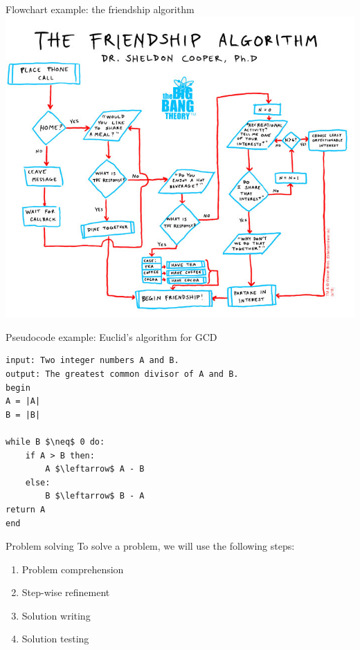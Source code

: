 \documentclass[aspectratio=169,]{beamer}
\begin{document}
\begin{frame}{Flowchart example: the friendship algorithm}
    \centering
    \includegraphics[height=\textheight]{block_sheldon.png}
\end{frame}

\begin{frame}[fragile]{Pseudocode example: Euclid's algorithm for GCD}
    \begin{lstlisting}[style=pseudo, linewidth=7cm]
input: Two integer numbers A and B.
output: The greatest common divisor of A and B.
begin
A = |A|
B = |B|

while B $\neq$ 0 do:
    if A > B then:
        A $\leftarrow$ A - B
    else:
        B $\leftarrow$ B - A
return A
end
    \end{lstlisting}
\end{frame}

\begin{frame}{Problem solving}
    To solve a problem, we will use the following steps:
    \begin{enumerate}
        \item{Problem comprehension}
        \item{Step-wise refinement}
        \item{Solution writing}
        \item{Solution testing}
    \end{enumerate}
\end{frame}
\end{document}

